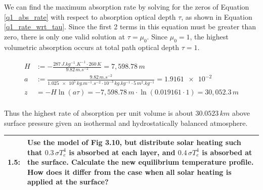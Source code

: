 \documentclass[12pt]{article}
\newcommand*{\problem}[2]{
    \begin{table}[ht]
    \centering
        \begin{tabular}{ | p{.1\linewidth} p{.9\linewidth} | }
            \hline
            \vspace{.3em}\textbf{\large#1:} & \vspace{.3em}\small{#2}\hspace{.2em}\vspace{.5em} \\ \hline
        \end{tabular}
    \end{table}
}
\begin{document}
We can find the maximum absorption rate by solving for the zeros of Equation \ref{q1_abs_rate} with respect to absorption optical depth $\tau$,
as shown in Equation \ref{q1_rate_wrt_tau}. Since the first 2 terms in this equation must be greater than zero, there is only one valid solution at
$\tau = \mu_0$. Since $\mu_0 = 1$, the highest volumetric absorption occurs at total path optical depth $\tau = 1$.

\begin{equation}
\begin{split}
    H &:= -\frac{287\,\si{J.kg^{-1}.K^{-1}} \cdot 260\,\si{K}}{9.82\,\si{m.s^{-2}}} = 7,598.78 \,\si{m} \\
    a &:= \frac{9.82\,\si{m.s^{-2}}}{\num{1.025e5}\,\si{kg.m^{-1}.s^{-2}} \cdot 10^{-3} \,\si{kg.kg^{-1}} \cdot 5\,\si{m^2.kg^{-1}}} = \num{1.9161e-2} \\
    z &= -H \ln(a\tau)= -7,598.78\,\si{m} \cdot \ln(0.019161 \cdot 1) = 30,052.3\,\si{m} \\
\end{split}
\end{equation}

Thus the highest rate of absorption per unit volume is about $30.0523\,\si{km}$ above surface pressure given an isothermal and hydrostatically balanced atmosphere.

\problem{1.5}{
    Use the model of Fig 3.10, but distribute solar heating such that $0.3\,\sigma T_e^4$ is absorbed at each layer, and $0.4\,\sigma T_e^4$ is absorbed at the surface.
    Calculate the new equilibrium temperature profile. How does it differ from the case when all solar heating is applied at the surface?
}
\end{document}
